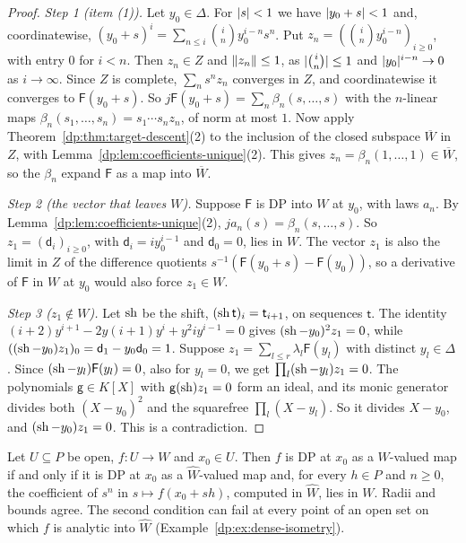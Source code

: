 \begin{proof}
\emph{Step 1 (item (1)).} Let $y_0\in\Delta$. For $\lvert s\rvert<1$ we have $\lvert y_0+s\rvert<1$ and, coordinatewise, $(y_0+s)^i=\sum_{n\le i}\binom iny_0^{i-n}s^n$. Put $z_n=(\binom iny_0^{i-n})_{i\ge0}$, with entry $0$ for $i<n$. Then $z_n\in Z$ and $\lVert z_n\rVert\le1$, as $\lvert \binom in\rvert\le1$ and $\lvert y_0\rvert^{i-n}\to0$ as $i\to\infty$. Since $Z$ is complete, $\sum_ns^nz_n$ converges in $Z$, and coordinatewise it converges to $\mathsf F(y_0+s)$. So $j\mathsf F(y_0+s)=\sum_n\beta_n(s,\dots,s)$ with the $n$-linear maps $\beta_n(s_1,\dots,s_n)=s_1\cdots s_nz_n$, of norm at most $1$. Now apply Theorem~\ref{dp:thm:target-descent}(2) to the inclusion of the closed subspace $\overline W$ in $Z$, with Lemma~\ref{dp:lem:coefficients-unique}(2). This gives $z_n=\beta_n(1,\dots,1)\in\overline W$, so the $\beta_n$ expand $\mathsf F$ as a map into $\overline W$.

\emph{Step 2 (the vector that leaves $W$).} Suppose $\mathsf F$ is DP into $W$ at $y_0$, with laws $a_n$. By Lemma~\ref{dp:lem:coefficients-unique}(2), $ja_n(s)=\beta_n(s,\dots,s)$. So $z_1=(\mathsf d_i)_{i\ge0}$, with $\mathsf d_i=iy_0^{i-1}$ and $\mathsf d_0=0$, lies in $W$. The vector $z_1$ is also the limit in $Z$ of the difference quotients $s^{-1}(\mathsf F(y_0+s)-\mathsf F(y_0))$, so a derivative of $\mathsf F$ in $W$ at $y_0$ would also force $z_1\in W$.

\emph{Step 3 ($z_1\notin W$).} Let $\operatorname{sh}$ be the shift, $(\operatorname{sh}\mathsf t)_i=\mathsf t_{i+1}$, on sequences $\mathsf t$. The identity $(i+2)y^{i+1}-2y(i+1)y^i+y^2iy^{i-1}=0$ gives $(\operatorname{sh}-y_0)^2z_1=0$, while $((\operatorname{sh}-y_0)z_1)_0=\mathsf d_1-y_0\mathsf d_0=1$. Suppose $z_1=\sum_{l\le r}\lambda_l\mathsf F(y_l)$ with distinct $y_l\in\Delta$. Since $(\operatorname{sh}-y_l)\mathsf F(y_l)=0$, also for $y_l=0$, we get $\prod_l(\operatorname{sh}-y_l)z_1=0$. The polynomials $\mathsf g\in K[X]$ with $\mathsf g(\operatorname{sh})z_1=0$ form an ideal, and its monic generator divides both $(X-y_0)^2$ and the squarefree $\prod_l(X-y_l)$. So it divides $X-y_0$, and $(\operatorname{sh}-y_0)z_1=0$. This is a contradiction.
\end{proof}

\begin{corollary}\label{dp:cor:completion}
Let $U\subseteq P$ be open, $f\colon U\to W$ and $x_0\in U$. Then $f$ is DP at $x_0$ as a $W$-valued map if and only if it is DP at $x_0$ as a $\widehat W$-valued map and, for every $h\in P$ and $n\ge0$, the coefficient of $s^n$ in $s\mapsto f(x_0+sh)$, computed in $\widehat W$, lies in $W$. Radii and bounds agree. The second condition can fail at every point of an open set on which $f$ is analytic into $\widehat W$ (Example~\ref{dp:ex:dense-isometry}).
\end{corollary}

